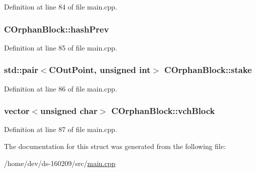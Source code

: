 Definition at line 84 of file main.\+cpp.

\hypertarget{struct_c_orphan_block_a8c6e5d47d1da746d59feefdc0eb9f55c}{}
\subsubsection[{hash\+Prev}]{ C\+Orphan\+Block\+::hash\+Prev}\label{struct_c_orphan_block_a8c6e5d47d1da746d59feefdc0eb9f55c}


Definition at line 85 of file main.\+cpp.

\hypertarget{struct_c_orphan_block_a11bf8c661061349166e335ba0dedd7fb}{}
\subsubsection[{stake}]{\setlength{\rightskip}{0pt plus 5cm}std\+::pair$<${\bf C\+Out\+Point}, unsigned int$>$ C\+Orphan\+Block\+::stake}\label{struct_c_orphan_block_a11bf8c661061349166e335ba0dedd7fb}


Definition at line 86 of file main.\+cpp.

\hypertarget{struct_c_orphan_block_a6d63003bce14214976acc149cd4813e8}{}
\subsubsection[{vch\+Block}]{\setlength{\rightskip}{0pt plus 5cm}vector$<$unsigned char$>$ C\+Orphan\+Block\+::vch\+Block}\label{struct_c_orphan_block_a6d63003bce14214976acc149cd4813e8}


Definition at line 87 of file main.\+cpp.



The documentation for this struct was generated from the following file\+:\begin{DoxyCompactItemize}
\item 
/home/dev/ds-\/160209/src/\hyperlink{main_8cpp}{main.\+cpp}\end{DoxyCompactItemize}
